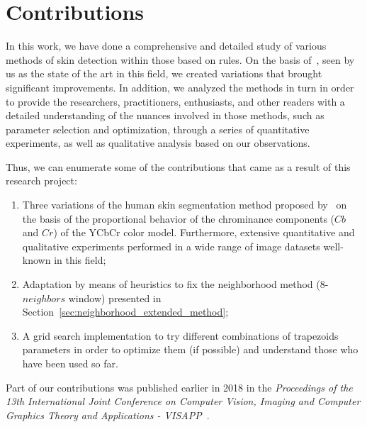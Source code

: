 \section{Contributions}
\label{sec:contributions}

In this work, we have done a comprehensive and detailed study of various methods of skin detection within those based on rules. On the basis of~\citet{brancati:17}, seen by us as the state of the art in this field, we created variations that brought significant improvements. In addition, we analyzed the methods in turn in order to provide the researchers, practitioners, enthusiasts, and other readers with a detailed understanding of the nuances involved in those methods, such as parameter selection and optimization, through a series of quantitative experiments, as well as qualitative analysis based on our observations.

Thus, we can enumerate some of the contributions that came as a result of this research project:
\begin{enumerate}
    \item Three variations of the human skin segmentation method proposed by~\citet{brancati:17} on the basis of the proportional behavior of the chrominance components ($Cb$ and $Cr$) of the YCbCr color model. Furthermore, extensive quantitative and qualitative experiments performed in a wide range of image datasets well-known in this field;
    \item Adaptation by means of heuristics to fix the neighborhood method (8-$neighbors$ window) presented in Section~\ref{sec:neighborhood_extended_method};
    \item A grid search implementation to try different combinations of trapezoids parameters in order to optimize them (if possible) and understand those who have been used so far.
\end{enumerate}

Part of our contributions was published earlier in 2018 in the \emph{Proceedings of the 13th International Joint Conference on Computer Vision, Imaging and Computer Graphics Theory and Applications - VISAPP}~\citep{faria:18}.


